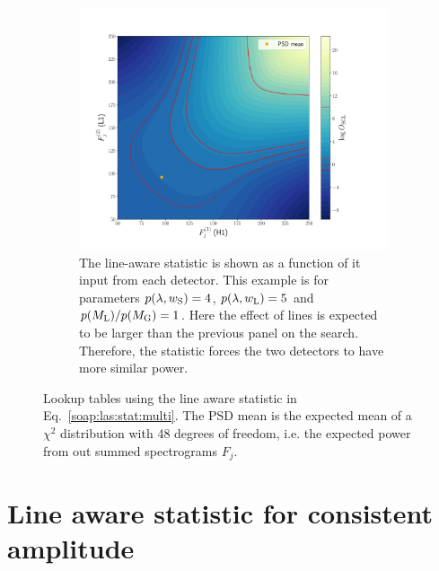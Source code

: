 \begin{figure}
\begin{subfigure}[h]{\linewidth}
\begin{minipage}{0.65\linewidth}
\includegraphics[width=0.9\columnwidth]{C3_soap/lookup_linebig.pdf}
\end{minipage}\hfill
\begin{minipage}{0.35\linewidth}
\caption{The line-aware statistic is shown as a function of it input from each detector. This example is for parameters $p(\lambda,w_{\rm{S}}) = 4$, $p(\lambda,w_{\rm{L}}) = 5$ and $p(M_{\rm{L}})/p(M_{\rm{G}}) = 1$. Here the effect of lines is expected to be larger than the previous panel on the search. Therefore, the statistic forces the two detectors to have more similar power.}
\label{soap:las:detp:linebig}
\end{minipage}
\end{subfigure}
\caption[Lookup table for line aware statistic.]{Lookup tables using the line aware statistic in Eq.~\ref{soap:las:stat:multi}. The \gls{PSD} mean is the expected mean of a $\chi^2$ distribution with 48 degrees of freedom, i.e. the expected power from out summed spectrograms $F_j$.}
\label{soap:las:osgl_plots}
\end{figure}


\section{\label{soap:lineawareamp}Line aware statistic for consistent amplitude}


